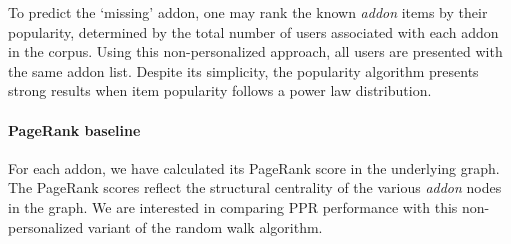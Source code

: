 \documentclass[ijoc,nonblindrev]{informs3} %
\numberwithin{equation}{subsection}
\begin{document}
To predict the `missing' addon, one may rank the known {\it addon} items by their popularity, determined by the total number of users associated with each addon in the corpus. Using this non-personalized approach, all users are presented with the same addon list. Despite its simplicity, the popularity algorithm presents strong results when item popularity follows a power law distribution. 

\paragraph{PageRank baseline} 

For each addon, we have calculated its PageRank score in the underlying graph. The PageRank scores reflect the structural centrality of the various {\it addon} nodes in the graph. We are interested in comparing PPR performance with this non-personalized variant of the random walk algorithm.
\end{document}
